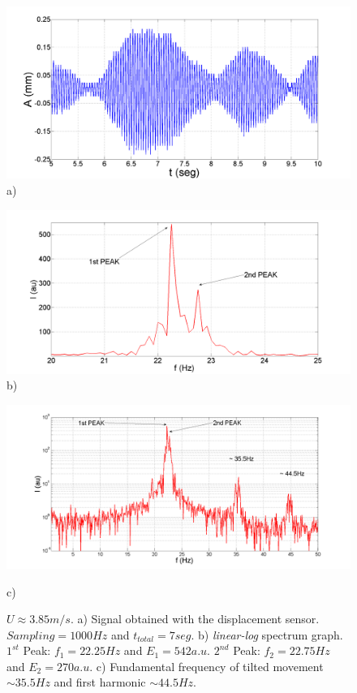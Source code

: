 \documentclass[review]{elsarticle}
\begin{document}
\begin{figure}[h]
\begin{minipage}[c]{\textwidth}
\begin{center}
\begin{minipage}[r]{0.48\textwidth}
\includegraphics[width=1\textwidth]{Figures/Fig_04_a}\\
{\footnotesize a)}
\end{minipage}\begin{minipage}[l]{0.52\textwidth}
\includegraphics[width=\textwidth]{Figures/Fig_04_b}\\
{\footnotesize b)}
\end{minipage}
\includegraphics[width=1\textwidth]{Figures/Fig_04_c}
\begin{flushleft}
{\footnotesize c)}
\end{flushleft}
\caption{$U \approx 3.85 m/s$. 
a) Signal obtained with the displacement sensor. $Sampling=1000Hz$ and $t_{total} = 7seg$.
b) {\it linear-log} spectrum graph. $1^{st}$ Peak: $f_{1} = 22.25Hz$ and $E_1 = 542a.u.$ $2^{nd}$ Peak: $f_{2} = 22.75Hz$ and $E_2 = 270 a.u.$ 
c) Fundamental frequency of tilted movement $\sim 35.5Hz$ and first harmonic $\sim 44.5Hz$.}
\label{fig:04}
\end{center}
\end{minipage}
\end{figure}
\end{document}
